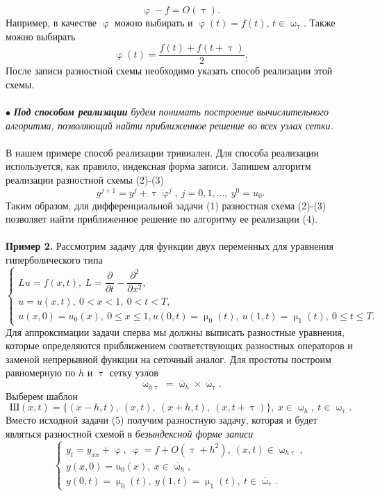 \documentclass[a4paper, 12pt]{report}
\numberwithin{equation}{section}
\newcommand{\ol}{\overline}
\renewcommand{\leq}{\leqslant}
\renewcommand{\varphi}{\upvarphi}
\renewcommand{\tau}{\uptau}
\renewcommand{\mu}{\upmu}
\renewcommand{\omega}{\upomega}
\renewcommand{\d}{\partial}
\begin{document}
		$$\varphi - f = O(\tau).$$
		Например, в качестве $\varphi$ можно выбирать и $\varphi(t) = f(t)$, $t \in \omega_{\tau}$. Также можно выбирать $$\varphi(t) = \dfrac{f(t) + f(t+\tau)}{2}.$$
		После записи разностной схемы необходимо указать способ реализации этой схемы.\\\\ $\bullet$ \textit{\textbf{Под способом реализации} будем понимать построение вычислительного алгоритма, позволяющий найти приближенное решение во всех узлах сетки.}\\\\
		В нашем примере способ реализации тривиален. Для способа реализации используется, как правило, индексная форма записи. Запишем алгоритм реализации разностной схемы (2)-(3)
		\begin{equation}
			y^{j+1}=y^j + \tau \varphi^j,\ j=0,1,\ldots,\ y^0 = u_0.
		\end{equation}
		Таким образом, для дифференциальной задачи (1) разностная схема (2)-(3) позволяет найти приближенное решение по алгоритму ее реализации (4).
		\\\\
		\textbf{Пример 2.}
		Рассмотрим задачу для функции двух переменных для уравнения гиперболического типа
		\begin{equation}
			\begin{cases}
				Lu = f(x,t), \ L = \dfrac{\d }{\d t} - \dfrac{\d ^2}{\d x^2},\\
			u = u(x,t),\ 0<x<1,\ 0<t<T,\\
			u(x,0) = u_0(x), \ 0\leq x \leq 1,
			u(0,t) = \mu_0(t),\ u(1,t) = \mu_1(t),\ 0\leq t\leq T.
			\end{cases}
		\end{equation}
		Для аппроксимации задачи сперва мы должны выписать разностные уравнения, которые определяются приближением соответствующих разностных операторов и заменой непрерывной функции на сеточный аналог. Для простоты построим равномерную по $h$ и $\tau$ сетку узлов
		$$\ol \omega_{h\tau} = \ol \omega_h \times \ol \omega_\tau.$$
		Выберем шаблон
		$$\text{Ш}(x,t) = \{(x-h, t),\ (x,t),\ (x+h,t),\ (x,t+\tau)\},\ x\in \omega_h,\ t \in \omega_\tau.$$
		Вместо исходной задачи (5) получим разностную задачу, которая и будет являться разностной схемой в \textit{безындексной форме записи}
		\begin{equation}
			\begin{cases}
				y_t = y_{\ol x x} + \varphi,\ \varphi = f+O(\tau + h^2),\ (x,t)\in \omega_{h\tau},\\
			y(x,0) = u_0(x),\ x\in \ol \omega_h,\\
			y(0, t) = \mu_0(t),\ y(1,t) = \mu_1(t),\ t\in \ol\omega_\tau.
			\end{cases}
		\end{equation}
\end{document}
